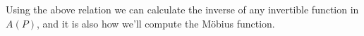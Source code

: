 \label{inverse-fn}

Using the above relation we can calculate the inverse of any invertible function in $A(P)$, and it is also how we'll compute the M\"obius function.
